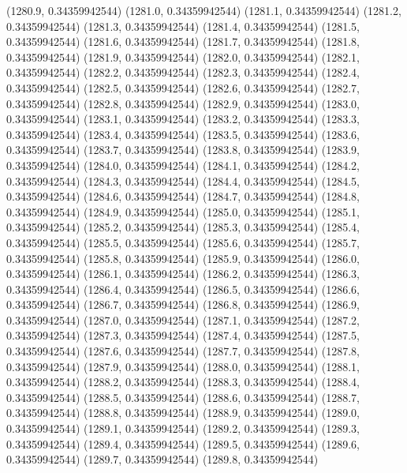 {					(1280.9, 0.34359942544)
					(1281.0, 0.34359942544)
					(1281.1, 0.34359942544)
					(1281.2, 0.34359942544)
					(1281.3, 0.34359942544)
					(1281.4, 0.34359942544)
					(1281.5, 0.34359942544)
					(1281.6, 0.34359942544)
					(1281.7, 0.34359942544)
					(1281.8, 0.34359942544)
					(1281.9, 0.34359942544)
					(1282.0, 0.34359942544)
					(1282.1, 0.34359942544)
					(1282.2, 0.34359942544)
					(1282.3, 0.34359942544)
					(1282.4, 0.34359942544)
					(1282.5, 0.34359942544)
					(1282.6, 0.34359942544)
					(1282.7, 0.34359942544)
					(1282.8, 0.34359942544)
					(1282.9, 0.34359942544)
					(1283.0, 0.34359942544)
					(1283.1, 0.34359942544)
					(1283.2, 0.34359942544)
					(1283.3, 0.34359942544)
					(1283.4, 0.34359942544)
					(1283.5, 0.34359942544)
					(1283.6, 0.34359942544)
					(1283.7, 0.34359942544)
					(1283.8, 0.34359942544)
					(1283.9, 0.34359942544)
					(1284.0, 0.34359942544)
					(1284.1, 0.34359942544)
					(1284.2, 0.34359942544)
					(1284.3, 0.34359942544)
					(1284.4, 0.34359942544)
					(1284.5, 0.34359942544)
					(1284.6, 0.34359942544)
					(1284.7, 0.34359942544)
					(1284.8, 0.34359942544)
					(1284.9, 0.34359942544)
					(1285.0, 0.34359942544)
					(1285.1, 0.34359942544)
					(1285.2, 0.34359942544)
					(1285.3, 0.34359942544)
					(1285.4, 0.34359942544)
					(1285.5, 0.34359942544)
					(1285.6, 0.34359942544)
					(1285.7, 0.34359942544)
					(1285.8, 0.34359942544)
					(1285.9, 0.34359942544)
					(1286.0, 0.34359942544)
					(1286.1, 0.34359942544)
					(1286.2, 0.34359942544)
					(1286.3, 0.34359942544)
					(1286.4, 0.34359942544)
					(1286.5, 0.34359942544)
					(1286.6, 0.34359942544)
					(1286.7, 0.34359942544)
					(1286.8, 0.34359942544)
					(1286.9, 0.34359942544)
					(1287.0, 0.34359942544)
					(1287.1, 0.34359942544)
					(1287.2, 0.34359942544)
					(1287.3, 0.34359942544)
					(1287.4, 0.34359942544)
					(1287.5, 0.34359942544)
					(1287.6, 0.34359942544)
					(1287.7, 0.34359942544)
					(1287.8, 0.34359942544)
					(1287.9, 0.34359942544)
					(1288.0, 0.34359942544)
					(1288.1, 0.34359942544)
					(1288.2, 0.34359942544)
					(1288.3, 0.34359942544)
					(1288.4, 0.34359942544)
					(1288.5, 0.34359942544)
					(1288.6, 0.34359942544)
					(1288.7, 0.34359942544)
					(1288.8, 0.34359942544)
					(1288.9, 0.34359942544)
					(1289.0, 0.34359942544)
					(1289.1, 0.34359942544)
					(1289.2, 0.34359942544)
					(1289.3, 0.34359942544)
					(1289.4, 0.34359942544)
					(1289.5, 0.34359942544)
					(1289.6, 0.34359942544)
					(1289.7, 0.34359942544)
					(1289.8, 0.34359942544)
}
